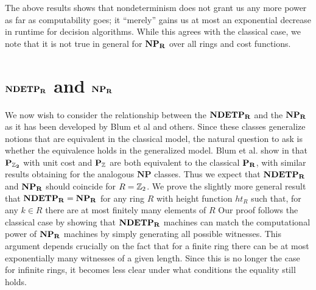 

The above results shows that nondeterminism does not grant us any more
power as far as computability goes; it ``merely'' gains us at most an
exponential decrease in runtime for decision algorithms.  While this
agrees with the classical case, we note that it is not true in general
for $\mathbf{NP_R}$ over all rings and cost functions.

\section{$\mathbf{NDETP_R}$ and $\mathbf{NP_R}$}

We now wish to consider the relationship between the $\mathbf{NDETP_R}$ and the
$\mathbf{NP_R}$ as it has been developed by Blum et al and others.  Since these
classes generalize notions that are equivalent in the classical model,
the natural question to ask is whether the equivalence holds in the
generalized model.  Blum et al. show in \cite{B89} that $\mathbf{P_{\mathbb{Z}_{2}}}$
with unit cost and $\mathbf{P_{\mathbb{Z}}}$ are both equivalent to the
classical $\mathbf{P_R}$, with similar results obtaining for the analogous
$\mathbf{NP}$ classes.  Thus we expect that $\mathbf{NDETP_R}$ and $\mathbf{NP_R}$ should
coincide for $R = \mathbb{Z}_{2}$.  We prove the slightly more general result
that $\mathbf{NDETP_R} = \mathbf{NP_R}$ for any ring $R$ with height function $ht_R$ such
that, for any $k \in R$ there are at most finitely many elements of
$R$ Our proof follows the classical case by showing that $\mathbf{NDETP_R}$
machines can match the computational power of $\mathbf{NP_R}$ machines by simply
generating all possible witnesses.  This argument depends crucially on
the fact that for a finite ring there can be at most exponentially
many witnesses of a given length.  Since this is no longer the case
for infinite rings, it becomes less clear under what conditions the
equality still holds.




